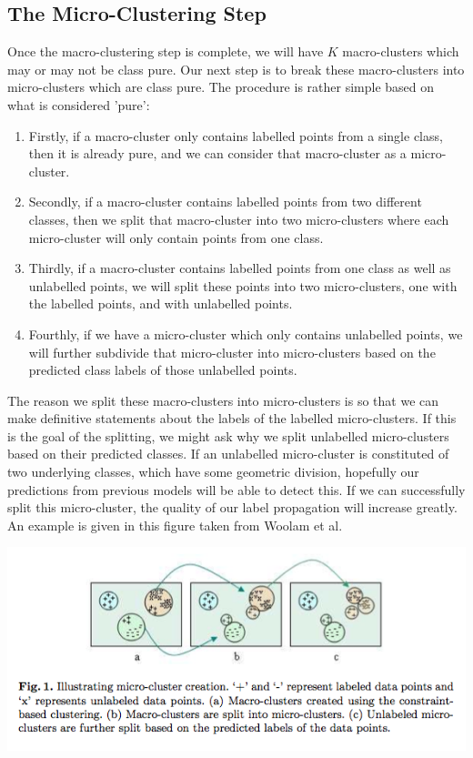 \documentclass[12pt,a4paper,oneside]{report}
\begin{document}
 \subsection{The Micro-Clustering Step}
 
Once the macro-clustering step is complete, we will have \(K\) macro-clusters which may or may not be class pure. Our next step is to break these macro-clusters into micro-clusters which are class pure. The procedure is rather simple based on what is considered 'pure':

\begin{enumerate}
\item Firstly, if a macro-cluster only contains labelled points from a single class, then it is already pure, and we can consider that macro-cluster as a micro-cluster. 
\item Secondly, if a macro-cluster contains labelled points from two different classes, then we split that macro-cluster into two micro-clusters where each micro-cluster will only contain points from one class. 
\item Thirdly, if a macro-cluster contains labelled points from one class as well as unlabelled points, we will split these points into two micro-clusters, one with the labelled points, and with unlabelled points. 
\item Fourthly, if we have a micro-cluster which only contains unlabelled points, we will further subdivide that micro-cluster into micro-clusters based on the predicted class labels of those unlabelled points.  
\end{enumerate}

The reason we split these macro-clusters into micro-clusters is so that we can make definitive statements about the labels of the labelled micro-clusters. If this is the goal of the splitting, we might ask why we split unlabelled micro-clusters based on their predicted classes. If an unlabelled micro-cluster is constituted of two underlying classes, which have some geometric division, hopefully our predictions from previous models will be able to detect this. If we can successfully split this micro-cluster, the quality of our label propagation will increase greatly. An example is given in this figure taken from Woolam et al.\cite{LabStr}

\includegraphics[scale = 0.7]{ClusterSplitting}
\end{document}
